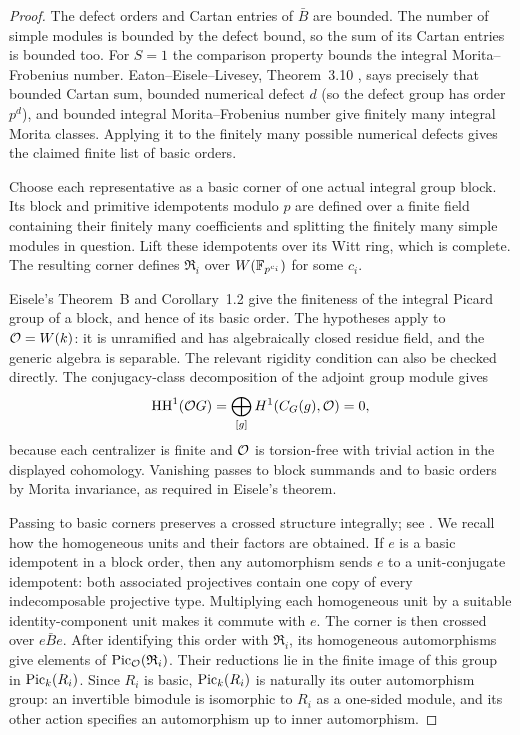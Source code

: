 \begin{proof}
The defect orders and Cartan entries of $\bar B$ are bounded.
The number of simple modules is bounded by the defect bound, so
the sum of its Cartan entries is bounded too.  For $S=1$ the
comparison property bounds the integral Morita--Frobenius number.
Eaton--Eisele--Livesey, Theorem~3.10 \cite{EEL}, says precisely
that bounded Cartan sum, bounded numerical defect $d$ (so the
defect group has order $p^d$), and bounded integral
Morita--Frobenius number give finitely many integral Morita classes.
Applying it to the finitely many possible numerical defects gives
the claimed finite list of basic orders.

Choose each representative as a basic corner of one actual
integral group block.  Its block and primitive idempotents modulo
$p$ are defined over a finite field containing their finitely many
coefficients and splitting the finitely many simple modules in
question.  Lift these idempotents over its Witt ring, which is
complete.  The resulting corner defines $\mathfrak R_i$ over
$W(\mathbb F_{p^{c_i}})$ for some $c_i$.

Eisele's Theorem~B and Corollary~1.2 \cite{EiselePicard} give the
finiteness of the integral Picard group of a block, and hence of
its basic order.  The hypotheses apply to $\mathcal O=W(k)$: it is
unramified and has algebraically closed residue field, and the
generic algebra is separable.  The relevant rigidity condition can
also be checked directly.  The conjugacy-class decomposition of
the adjoint group module gives
\[
 \operatorname{HH}^1(\mathcal O G)
   =\bigoplus_{[g]}H^1(C_G(g),\mathcal O)=0,
\]
because each centralizer is finite and $\mathcal O$ is torsion-free with
trivial action in the displayed cohomology.  Vanishing passes to
block summands and to basic orders by Morita invariance, as
required in Eisele's theorem.

Passing to basic corners preserves a crossed structure integrally;
see \cite[Proposition~4.15 and Corollary~4.16(2)]{EiseleReduction}.
We recall how the homogeneous units and their factors are obtained.
If $e$ is a basic idempotent in a block order, then any automorphism
sends $e$ to a unit-conjugate
idempotent: both associated projectives contain one copy of every
indecomposable projective type.  Multiplying each homogeneous unit
by a suitable identity-component unit makes it commute with $e$.
The corner is then crossed over $e\bar B e$.  After identifying
this order with $\mathfrak R_i$, its homogeneous automorphisms
give elements of $\operatorname{Pic}_{\mathcal O}(\mathfrak R_i)$.  Their reductions
lie in the finite image of this group in $\operatorname{Pic}_k(R_i)$.  Since
$R_i$ is basic, $\operatorname{Pic}_k(R_i)$ is naturally its outer automorphism
group: an invertible bimodule is isomorphic to $R_i$ as a one-sided
module, and its other action specifies an automorphism up to
inner automorphism.
\end{proof}

